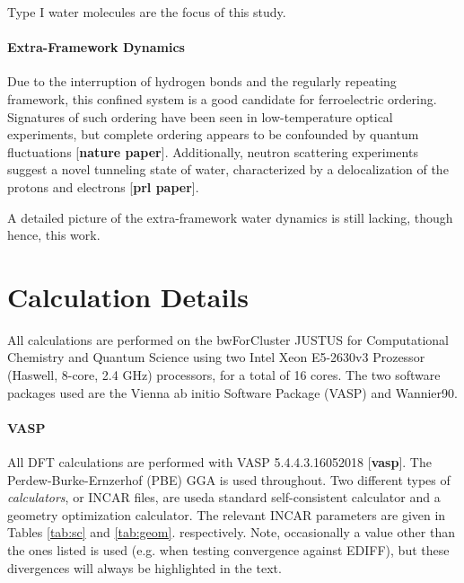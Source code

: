         Type I water molecules are the focus of this study.
        
        \paragraph{Extra-Framework Dynamics} Due to the interruption of hydrogen bonds and the regularly repeating framework, this confined system is a good candidate for ferroelectric ordering. Signatures of such ordering have been seen in low-temperature optical experiments, but complete ordering appears to be confounded by quantum fluctuations [\textbf{nature paper}]. Additionally, neutron scattering experiments suggest a novel tunneling state of water, characterized by a delocalization of the protons and electrons [\textbf{prl paper}].
        
        A detailed picture of the extra-framework water dynamics is still lacking, though \textemdash hence, this work.
        
    \section{Calculation Details}
    \label{sec:calc_details}
    
    All calculations are performed on the bwForCluster JUSTUS for Computational Chemistry and Quantum Science using two Intel Xeon E5-2630v3 Prozessor (Haswell, 8-core, 2.4 GHz) processors, for a total of 16 cores. The two software packages used are the Vienna ab initio Software Package (VASP) and Wannier90.
    
    \paragraph{VASP} All DFT calculations are performed with VASP 5.4.4.3.16052018 [\textbf{vasp}]. The Perdew-Burke-Ernzerhof (PBE) GGA is used throughout. Two different types of \textit{calculators}, or INCAR files, are used\textemdash a standard self-consistent calculator and a geometry optimization calculator. The relevant INCAR parameters are given in Tables \ref{tab:sc} and \ref{tab:geom}. respectively. Note, occasionally a value other than the ones listed is used (e.g. when testing convergence against EDIFF), but these divergences will always be highlighted in the text.
    
